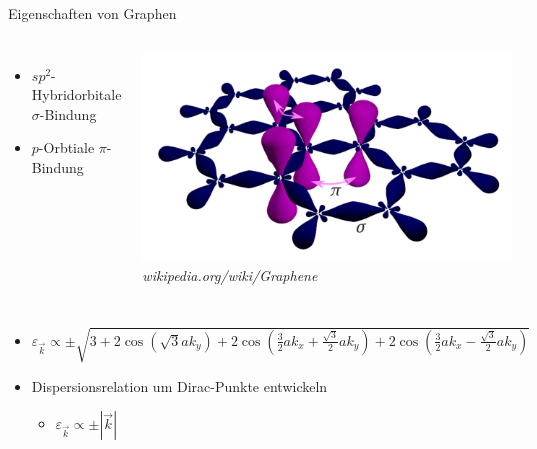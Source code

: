 \documentclass[aspectratio=1610, 9pt, xcolor=dvipsnames]{beamer}
\begin{document}
\begin{frame}{Eigenschaften von Graphen}
\begin{columns}
  \begin{itemize}
      \item $sp^2$-Hybridorbitale {\color{tugreen} \textrightarrow} $\sigma$-Bindung 
      \item $p$-Orbtiale {\color{tugreen} \textrightarrow} $\pi$-Bindung
      \end{itemize}
  \centering
    \includegraphics[width=\textwidth]{Plots/orbitals.png}
    \hspace*{12pt}\hbox{\scriptsize {\footnotesize\itshape wikipedia.org/wiki/Graphene}}
  \end{columns}
  \begin{columns}
  \pause 
  \begin{itemize}
    \vspace*{-2cm}
      \item 
      $\varepsilon_{\vec{k}} \propto \pm \sqrt{3+2 \cos \left ( \sqrt{3}ak_y \right )+2\cos \left ( \frac{3}{2}ak_x+\frac{\sqrt{3}}{2}ak_y \right ) + 2\cos \left ( \frac{3}{2}ak_x-\frac{\sqrt{3}}{2}ak_y \right ) }$
    \item Dispersionsrelation um Dirac-Punkte entwickeln
      \begin{itemize}
        \item[\textrightarrow] $\varepsilon_{\vec{k}} \propto \pm | \vec{k} |$
      \end{itemize}
    \end{itemize} 
    \vspace*{0.3cm}
    \centering
      \includegraphics[width=\textwidth]{Plots/dirac_cones.png}

\end{columns}
\end{frame}
\end{document}

